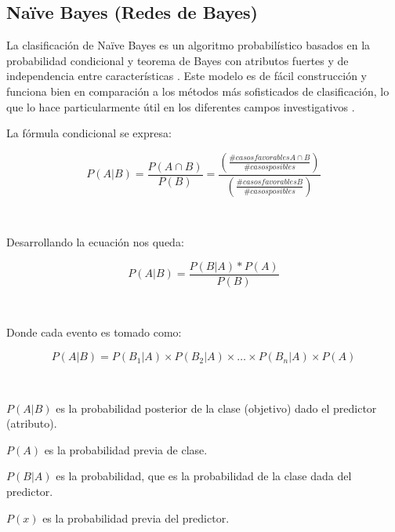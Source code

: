 \subsection{Naïve Bayes (Redes de Bayes)}
La clasificación de Naïve Bayes es un algoritmo probabilístico basados en la probabilidad condicional y teorema de Bayes con atributos fuertes y de independencia entre características \cite{Shafe}. Este modelo es de fácil construcción y funciona bien en comparación a los métodos más sofisticados de clasificación, lo que lo hace particularmente útil en los diferentes campos investigativos \cite{Vembandasamy2015}.\\
\par La fórmula condicional se expresa:\\
\begin{Large}
	\begin{equation}
		P(A|B)=\frac{P(A \cap B)}{P(B)}= \frac{(\frac{\#casos favorables A \cap B}{\#casos posibles})}{(\frac{\#casos favorables B}{\#casos posibles})}
	\end{equation}
\end{Large}\\
\par Desarrollando la ecuación nos queda:\\
\begin{Large}
	\begin{equation}
		P(A|B)=\frac{P(B|A)*P(A)}{P(B)}
	\end{equation}
\end{Large}\\
\par Donde cada evento es tomado como:\\
\begin{large}
	\begin{equation}
		P(A|B)= P(B_{1}|A) \times P(B_{2}|A) \times … \times P(B_{n}|A) \times P(A)
	\end{equation}
\end{large}\\
\par $P(A|B)$ es la probabilidad posterior de la clase (objetivo) dado el predictor (atributo).
\par $P(A)$ es la probabilidad previa de clase.
\par $P(B|A)$ es la probabilidad, que es la probabilidad de la clase dada del predictor.
\par  $P(x)$ es la probabilidad previa del predictor.\\

